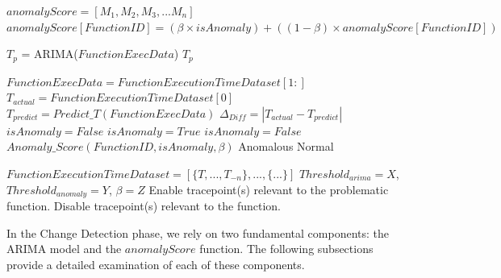 \documentclass[pdflatex,sn-nature]{sn-jnl}%
\theoremstyle{thmstyleone}%
\theoremstyle{thmstyletwo}%
\theoremstyle{thmstylethree}%
\begin{document}
\begin{algorithm}[tbp]

  \caption{Change Detection Algorithm}\label{changedetect}

  \begin{algorithmic}[1]

    \State $anomalyScore=[M_1, M_2, M_3,...M_n]$
        \State $anomalyScore[FunctionID]=(\beta \times isAnomaly)+((1 - \beta) \times anomalyScore[FunctionID])$
    \EndFunction
    
        \State $T_p$ = ARIMA($FunctionExecData$)
        \State \Return $T_p$
    \EndFunction
    
        \State $FunctionExecData=FunctionExecutionTimeDataset[1:]$
        \State $T_{actual} = FunctionExecutionTimeDataset[0]$
        \State $T_{predict} = Predict\_T(FunctionExecData)$
        \State $\Delta_{Diff} = |T_{actual} - T_{predict}|$
        \State $isAnomaly=False$
            \State $isAnomaly=True$
        \Else
            \State $isAnomaly=False$
        \EndIf
        \State $Anomaly\_Score(FunctionID, isAnomaly,\beta)$
            \State \Return Anomalous
        \Else
            \State \Return Normal
        \EndIf
    \EndFunction

    \State $FunctionExecutionTimeDataset=[\{T,...,T_{-n}\},...,\{...\}]$
    \State $Threshold_{arima}=X$, $Threshold_{anomaly}=Y$, $\beta=Z$
            \State Enable tracepoint(s) relevant to the problematic function.
        \Else
            \State Disable tracepoint(s) relevant to the function.
        \EndIf
    \EndFor
        
  \end{algorithmic}
\end{algorithm}

In the Change Detection phase, we rely on two fundamental components: the ARIMA model and the $anomalyScore$ function. The following subsections provide a detailed examination of each of these components. 
\end{document}

